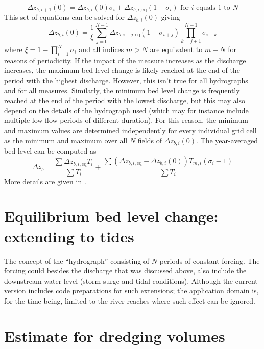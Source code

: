 %
\begin{equation}
\Delta z_{b,i+1}(0) = \Delta z_{b,i}(0) \sigma_i + \Delta z_{b,i,\text{eq}} (1-\sigma_i) \text{ for $i$ equals 1 to $N$}
\label{Eq:zbiNPeriods}
\end{equation}
%
This set of equations can be solved for $\Delta z_{b,i}(0)$ giving
%
\begin{equation}
\Delta z_{b,i}(0) = \frac{1}{\xi} \sum_{j=0}^{N-1} \Delta z_{b,i+j,\text{eq}} (1-\sigma_{i+j}) \prod_{k=j+1}^{N-1} \sigma_{i+k}
\end{equation}
%
where $\xi = 1 - \prod_{i=1}^N \sigma_i$ and all indices $m>N$ are equivalent to $m-N$ for reasons of periodicity.
If the impact of the measure increases as the discharge increases, the maximum bed level change is likely reached at the end of the period with the highest discharge.
However, this isn't true for all hydrographs and for all measures.
Similarly, the minimum bed level change is frequently reached at the end of the period with the lowest discharge, but this may also depend on the details of the hydrograph used (which may for instance include multiple low flow periods of different duration).
For this reason, the minimum and maximum values are determined independently for every individual grid cell as the minimum and maximum over all $N$ fields of $\Delta z_{b,i}(0)$.
The year-averaged bed level can be computed as
%
\begin{equation}
\bar{\Delta z_b} = \frac{\sum{\Delta z_{b,i,\text{eq}} T_i}}{\sum{T_i}} + \frac{\sum{(\Delta z_{b,i,\text{eq}} - \Delta z_{b,i}(0)) T_{m,i} (\sigma_i-1)}}{\sum{T_i}}
\label{Eq:zbMean}
\end{equation}
%
More details are given in \citet{JagersGiri2022}.


\section{Equilibrium bed level change: extending to tides}\label{Sec:Tides}

The concept of the ``hydrograph'' consisting of $N$ periods of constant forcing.
The forcing could besides the discharge that was discussed above, also include the downstream water level (storm surge and tidal conditions).
Although the current \dfastmi version includes code preparations for such extensions; the application domain is, for the time being, limited to the river reaches where such effect can be ignored.


\section{Estimate for dredging volumes}\label{Sec:DredgeVol}

